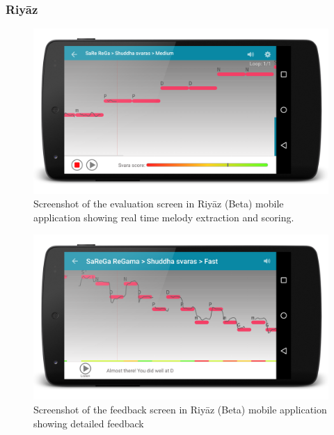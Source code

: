 \subsubsection{Riy\={a}z}
\label{sec:riyaz}

\begin{figure}
	\begin{center}
		\includegraphics[width=\figSizeEightyFive]{ch08_applications/figures/riyaz1.png}
	\end{center}
	\caption{Screenshot of the evaluation screen in Riy\={a}z (Beta) mobile application showing real time melody extraction and scoring.}
	\label{fig:browser_patterns}
\end{figure}
\begin{figure}
	\begin{center}
		\includegraphics[width=\figSizeEightyFive]{ch08_applications/figures/riyaz2.png}
	\end{center}
	\caption{Screenshot of the feedback screen in Riy\={a}z (Beta) mobile application showing detailed feedback}
	\label{fig:browser_patterns}
\end{figure}



